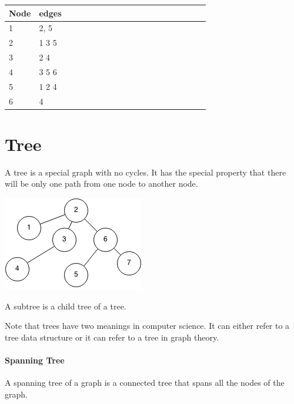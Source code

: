 \documentclass[11pt,oneside]{book}
\makeatletter
\def\maxwidth#1{\ifdim\Gin@nat@width>#1 #1\else\Gin@nat@width\fi}
\makeatother
\begin{document}
\vspace{10pt} \begin{tabulary}{0.4\linewidth}{|l|l|l|l|l|l|l|l|l|l|l|l|l|l|l|l|l|l|l}\hline


  Node &
  edges\\
\hline


  1 &
  2, 5\\

  2 &
  1 3 5\\

  3 &
  2 4\\

  4 &
  3 5 6\\

  5 &
  1 2 4\\

  6 &
  4\\

\hline\end{tabulary}

    \chapter{ Tree }
        



A tree is a special graph with no cycles. It has the special property that there will be only one path from one node to another node.

\includegraphics[width=\maxwidth{\textwidth}]{treegraph.png}

A subtree is a child tree of a tree.

Note that trees have two meanings in computer science. It can either refer to a tree data structure or it can refer to a tree in graph theory.


\subsubsection{Spanning Tree}



A spanning tree of a graph is a connected tree that spans all the nodes of the graph.
\end{document}
